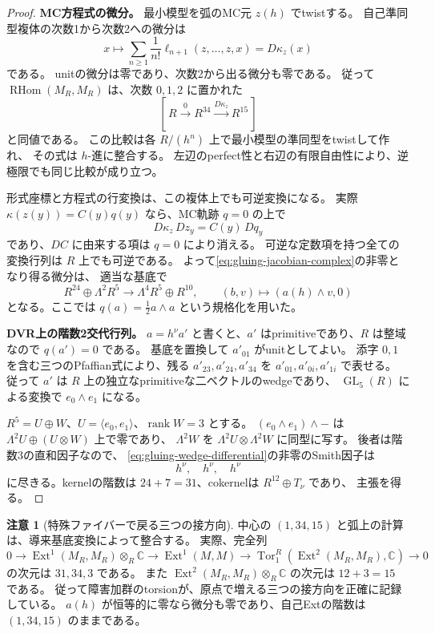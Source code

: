 \documentclass[a4paper,11pt]{ltjsarticle}
\theoremstyle{definition}
\newtheorem{remark}[theorem]{注意}
\newcommand{\CC}{\mathbb C}
\newcommand{\Ext}{\operatorname{Ext}}
\newcommand{\RHom}{\operatorname{RHom}}
\newcommand{\rk}{\operatorname{rank}}
\begin{document}
\begin{proof}
\textbf{MC方程式の微分。}
最小模型を弧のMC元 $z(h)$ でtwistする。
自己準同型複体の次数1から次数2への微分は
\[
 x\longmapsto\sum_{n\ge1}\frac1{n!}\ell_{n+1}(z,\ldots,z,x)
       =D\kappa_z(x)
\]
である\cite[Proposition 4.4]{Getzler}。
unitの微分は零であり、次数2から出る微分も零である。
従って $\RHom(M_R,M_R)$ は、次数 $0,1,2$ に置かれた
\begin{equation}\label{eq:gluing-jacobian-complex}
 [\,R\xrightarrow{0}R^{34}\xrightarrow{D\kappa_z}R^{15}\,]
\end{equation}
と同値である。
この比較は各 $R/(h^n)$ 上で最小模型の準同型をtwistして作れ、
その式は $h$-進に整合する。
左辺のperfect性と右辺の有限自由性により、逆極限でも同じ比較が成り立つ。

形式座標と方程式の行変換は、この複体上でも可逆変換になる。
実際 $\kappa(z(y))=C(y)q(y)$ なら、MC軌跡 $q=0$ の上で
\[
 D\kappa_z\,Dz_y=C(y)\,Dq_y
\]
であり、$DC$ に由来する項は $q=0$ により消える。
可逆な定数項を持つ全ての変換行列は $R$ 上でも可逆である。
よって\eqref{eq:gluing-jacobian-complex}の非零となり得る微分は、
適当な基底で
\begin{equation}\label{eq:gluing-wedge-differential}
 R^{24}\oplus\Lambda^2R^5
 \longrightarrow\Lambda^4R^5\oplus R^{10},\qquad
 (b,v)\longmapsto(a(h)\wedge v,0)
\end{equation}
となる。ここでは $q(a)=\tfrac12a\wedge a$ という規格化を用いた。

\textbf{DVR上の階数2交代行列。}
$a=h^{\nu} a'$ と書くと、$a'$ はprimitiveであり、$R$ は整域なので $q(a')=0$ である。
基底を置換して $a'_{01}$ がunitとしてよい。
添字 $0,1$ を含む三つのPfaffian式により、残る
$a'_{23},a'_{24},a'_{34}$ を $a'_{01},a'_{0i},a'_{1i}$ で表せる。
従って $a'$ は $R$ 上の独立なprimitiveな二ベクトルのwedgeであり、
$\operatorname{GL}_5(R)$ による変換で $e_0\wedge e_1$ になる。

$R^5=U\oplus W$、$U=\langle e_0,e_1\rangle$、$\rk W=3$ とする。
$(e_0\wedge e_1)\wedge-$ は
$\Lambda^2U\oplus(U\otimes W)$ 上で零であり、
$\Lambda^2W$ を $\Lambda^2U\otimes\Lambda^2W$ に同型に写す。
後者は階数3の直和因子なので、
\eqref{eq:gluing-wedge-differential}の非零のSmith因子は
\[
                         h^{\nu},\quad h^{\nu},\quad h^{\nu}
\]
に尽きる。kernelの階数は $24+7=31$、cokernelは $R^{12}\oplus T_\nu$ であり、
主張を得る。
\end{proof}

\begin{remark}[特殊ファイバーで戻る三つの接方向]
中心の $(1,34,15)$ と弧上の計算は、導来基底変換によって整合する。
実際、完全列
\[
 0\longrightarrow\Ext^1(M_R,M_R)\otimes_R\CC
 \longrightarrow\Ext^1(M,M)
 \longrightarrow\operatorname{Tor}_1^R(\Ext^2(M_R,M_R),\CC)
 \longrightarrow0
\]
の次元は $31,34,3$ である。
また $\Ext^2(M_R,M_R)\otimes_R\CC$ の次元は $12+3=15$ である。
従って障害加群のtorsionが、原点で増える三つの接方向を正確に記録している。
$a(h)$ が恒等的に零なら微分も零であり、自己Extの階数は $(1,34,15)$ のままである。
\end{remark}
\end{document}
